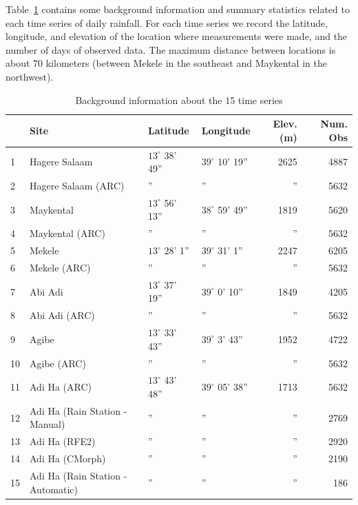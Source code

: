 \documentclass[11pt]{article}
\begin{document}
Table~\ref{tab_summary} contains some background information and summary statistics related to each time series of daily rainfall. For each time series we record the latitude, longitude, and elevation of the location where measurements were made, and the number of days of observed data. The maximum distance between locations is about 70 kilometers (between Mekele in the southeast and Maykental in the northwest).
\begin{table}[htdp]
\caption{Background information about the 15 time series}
\begin{center}
\begin{tabular}{|l|l|l|l|r|r|}
\hline
 & Site & Latitude & Longitude & Elev. (m) & Num. Obs \\
\hline
1 & Hagere Salaam & $13^\circ$ 38' 49'' & $39^\circ$ 10' 19'' & 2625 & 4887 \\
2 & Hagere Salaam (ARC) & '' & '' & '' & 5632 \\
3 & Maykental & $13^\circ$ 56' 13'' & $38^\circ$ 59' 49'' & 1819 & 5620 \\
4 & Maykental (ARC) & '' & '' & '' & 5632 \\
5 & Mekele & $13^\circ$ 28' 1'' & $39^\circ$ 31' 1'' & 2247 & 6205 \\
6 & Mekele (ARC) & '' & '' & '' & 5632 \\
7 & Abi Adi & $13^\circ$ 37' 19'' & $39^\circ$ 0' 10'' & 1849 & 4205 \\
8 & Abi Adi (ARC) & '' & '' & '' & 5632 \\
9 & Agibe & $13^\circ$ 33' 43'' & $39^\circ$ 3' 43'' & 1952 & 4722 \\
10 & Agibe (ARC) & '' & '' & '' & 5632 \\
11 & Adi Ha (ARC) & $13^\circ$ 43' 48'' & $39^\circ$ 05' 38'' & 1713 & 5632 \\
12 & Adi Ha (Rain Station - Manual) & '' & '' & '' & 2769 \\
13 & Adi Ha (RFE2) & '' & '' & '' & 2920 \\
14 & Adi Ha (CMorph) & '' & '' & '' & 2190 \\
15 & Adi Ha (Rain Station - Automatic) & '' & '' & '' & 186 \\
\hline
\end{tabular}
\end{center}
\label{tab_summary}
\end{table}
\end{document}
